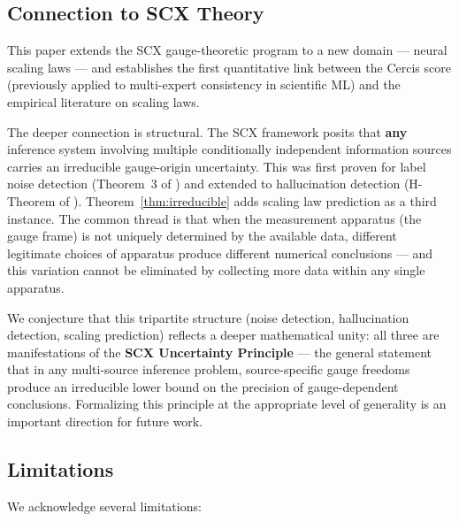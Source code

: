\documentclass[12pt,a4paper]{article}
\theoremstyle{remark}
\begin{document}
\subsection{Connection to SCX Theory}

This paper extends the SCX gauge-theoretic program \cite{scx_gauge_formalized, scx_gauge_physics, scx_fiber_bundle} to a new domain — neural scaling laws — and establishes the first quantitative link between the Cercis score (previously applied to multi-expert consistency in scientific ML) and the empirical literature on scaling laws.

The deeper connection is structural. The SCX framework posits that \textbf{any} inference system involving multiple conditionally independent information sources carries an irreducible gauge-origin uncertainty. This was first proven for label noise detection (Theorem~3 of \cite{scx2026}) and extended to hallucination detection (H-Theorem of \cite{scx_llm}). Theorem~\ref{thm:irreducible} adds scaling law prediction as a third instance. The common thread is that when the measurement apparatus (the gauge frame) is not uniquely determined by the available data, different legitimate choices of apparatus produce different numerical conclusions — and this variation cannot be eliminated by collecting more data within any single apparatus.

We conjecture that this tripartite structure (noise detection, hallucination detection, scaling prediction) reflects a deeper mathematical unity: all three are manifestations of the \textbf{SCX Uncertainty Principle} — the general statement that in any multi-source inference problem, source-specific gauge freedoms produce an irreducible lower bound on the precision of gauge-dependent conclusions. Formalizing this principle at the appropriate level of generality is an important direction for future work.

\subsection{Limitations}

We acknowledge several limitations:
\end{document}
